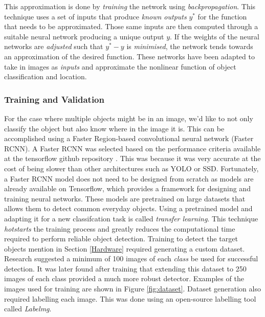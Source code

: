 \documentclass{UoNMCHA}
\numberwithin{equation}{section}
\begin{document}
This approximation is done by \textit{training} the network using \textit{backpropagation}. This technique uses a set of inputs that produce \textit{known outputs} $y^*$ for the function that needs to be approximated. Those same inputs are then computed through a suitable neural network producing a unique output $y$. If the weights of the neural networks are \textit{adjusted} such that $y^* - y$ is \textit{minimised}, the network tends towards an approximation of the desired function. 
These networks have been adapted to take in images as \textit{inputs} and approximate the nonlinear function of object classification and location.

\subsubsection{Training and Validation}

For the case where multiple objects might be in an image, we'd like to not only classify the object but also know where in the image it is. This can be accomplished using a Faster Region-based convolutional neural network (Faster RCNN). A Faster RCNN was selected based on the performance criteria available at the tensorflow github repository \cite{github}. This was because it was very accurate at the cost of being slower than other architectures such as YOLO or SSD.
Fortunately, a Faster RCNN model does not need to be designed from scratch as models are already available on Tensorflow, which provides a framework for designing and training neural networks. These models are pretrained on large datasets that allows them to detect common everyday objects. Using a pretrained model and adapting it for a new classifcation task is called \textit{transfer learning}. This technique \textit{hotstarts} the training process and greatly reduces the computational time required to perform reliable object detection.
Training to detect the target objects mention in Section \ref{Hardware} required generating a custom dataset. Research suggested a minimum of 100 images of each \textit{class} be used for successful detection. It was later found after training that extending this dataset to 250 images of each class provided a much more robust detector. Examples of the images used for training are shown in Figure \ref{fig:dataset}.  
Dataset generation also required labelling each image. This was done using an open-source labelling tool called \textit{Labelmg}.
\end{document}
